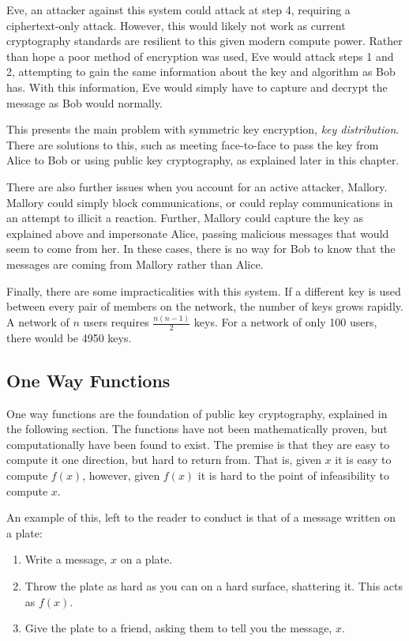 				Eve, an attacker against this system could attack at step 4, requiring a ciphertext-only attack.
				However, this would likely not work as current cryptography standards are resilient to this given modern compute power.
				Rather than hope a poor method of encryption was used, Eve would attack steps 1 and 2,
				attempting to gain the same information about the key and algorithm as Bob has.
				With this information, Eve would simply have to capture and decrypt the message as Bob would normally.

				This presents the main problem with symmetric key encryption, \emph{key distribution}.
				There are solutions to this, such as meeting face-to-face to pass the key from Alice to Bob or
				using public key cryptography, as explained later in this chapter.

				There are also further issues when you account for an active attacker, Mallory.
				Mallory could simply block communications, or could replay communications in an attempt to illicit a reaction.
				Further, Mallory could capture the key as explained above and impersonate Alice, passing malicious messages that would seem to come from her.
				In these cases, there is no way for Bob to know that the messages are coming from Mallory rather than Alice.

				Finally, there are some impracticalities with this system.
				If a different key is used between every pair of members on the network, the number of keys grows rapidly.
				A network of $n$ users requires $\frac{n(n-1)}{2}$ keys.
				For a network of only 100 users, there would be 4950 keys.
			\subsection{One Way Functions}
				One way functions are the foundation of public key cryptography, explained in the following section.
				The functions have not been mathematically proven, but computationally have been found to exist.
				The premise is that they are easy to compute it one direction, but hard to return from.
				That is, given $x$ it is easy to compute $f(x)$,
				however, given $f(x)$ it is hard to the point of infeasibility to compute $x$.

				An example of this, left to the reader to conduct is that of a message written on a plate:
				\begin{enumerate}
					\item Write a message, $x$ on a plate.
					\item Throw the plate as hard as you can on a hard surface, shattering it.
						This acts as $f(x)$.
					\item Give the plate to a friend, asking them to tell you the message, $x$.
				\end{enumerate}

